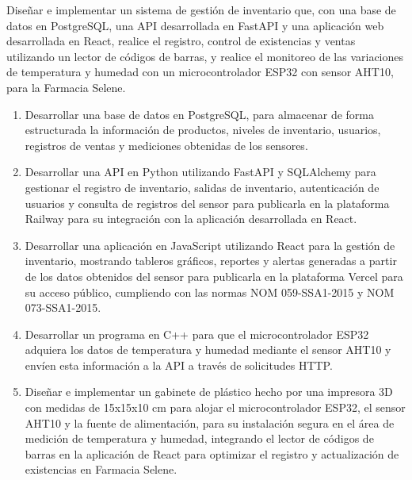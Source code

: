 Diseñar e implementar un sistema de gestión de inventario que, con una base de datos en PostgreSQL, una API desarrollada en FastAPI y una aplicación web desarrollada en React, realice el registro, control de existencias y ventas utilizando un lector de códigos de barras, y realice el monitoreo de las variaciones de temperatura y humedad con un microcontrolador ESP32 con sensor AHT10, para la Farmacia Selene.


\begin{enumerate}
\item Desarrollar una base de datos en PostgreSQL, para almacenar de forma estructurada la información de productos, niveles de inventario, usuarios, registros de ventas y mediciones obtenidas de los sensores.

\item Desarrollar una API en Python utilizando FastAPI y SQLAlchemy para gestionar el registro de inventario, salidas de inventario, autenticación de usuarios y consulta de registros del sensor para publicarla en la plataforma Railway para su integración con la aplicación desarrollada en React.

\item Desarrollar una aplicación en JavaScript utilizando React para la gestión de inventario, mostrando tableros gráficos, reportes y alertas generadas a partir de los datos obtenidos del sensor para publicarla en la plataforma Vercel para su acceso público, cumpliendo con las normas NOM 059-SSA1-2015 y NOM 073-SSA1-2015.

\item Desarrollar un programa en C++ para que el microcontrolador ESP32 adquiera los datos de temperatura y humedad mediante el sensor AHT10 y envíen esta información a la API a través de solicitudes HTTP.  

\item Diseñar e implementar un gabinete de plástico hecho por una impresora 3D con medidas de 15x15x10 cm para alojar el microcontrolador ESP32, el sensor AHT10 y la fuente de alimentación, para su instalación segura en el área de medición de temperatura y humedad, integrando el lector de códigos de barras en la aplicación de React para optimizar el registro y actualización de existencias en Farmacia Selene.

\end{enumerate}

\thispagestyle{empty}
